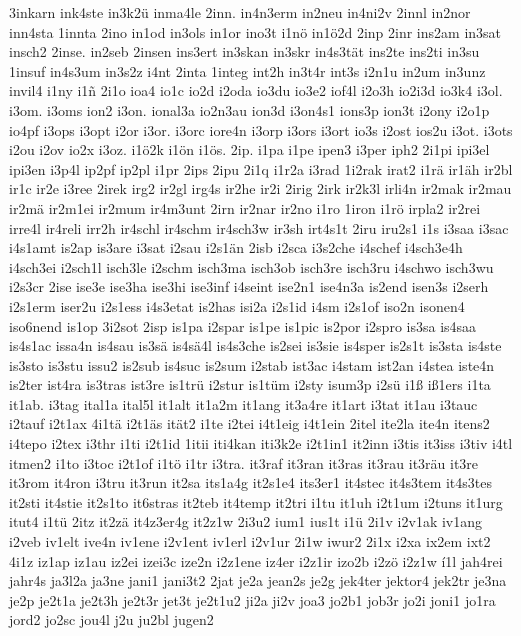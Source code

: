 {3inkarn
ink4ste
in3k2ü
inma4le
2inn.
in4n3erm
in2neu
in4ni2v
2innl
in2nor
inn4sta
1innta
2ino
in1od
in3ols
in1or
ino3t
i1nö
in1ö2d
2inp
2inr
ins2am
in3sat
insch2
2inse.
in2seb
2insen
ins3ert
in3skan
in3skr
in4s3tät
ins2te
ins2ti
in3su
1insuf
in4s3um
in3s2z
i4nt
2inta
1integ
int2h
in3t4r
int3s
i2n1u
in2um
in3unz
invil4
i1ny
i1ñ
2i1o
ioa4
io1c
io2d
i2oda
io3du
io3e2
iof4l
i2o3h
io2i3d
io3k4
i3ol.
i3om.
i3oms
ion2
i3on.
ional3a
io2n3au
ion3d
i3on4s1
ions3p
ion3t
i2ony
i2o1p
io4pf
i3ops
i3opt
i2or
i3or.
i3orc
iore4n
i3orp
i3ors
i3ort
io3s
i2ost
ios2u
i3ot.
i3ots
i2ou
i2ov
io2x
i3oz.
i1ö2k
i1ön
i1ös.
2ip.
i1pa
i1pe
ipen3
i3per
iph2
2i1pi
ipi3el
ipi3en
i3p4l
ip2pf
ip2pl
i1pr
2ips
2ipu
2i1q
i1r2a
i3rad
1i2rak
irat2
i1rä
ir1äh
ir2bl
ir1c
ir2e
i3ree
2irek
irg2
ir2gl
irg4s
ir2he
ir2i
2irig
2irk
ir2k3l
irli4n
ir2mak
ir2mau
ir2mä
ir2m1ei
ir2mum
ir4m3unt
2irn
ir2nar
ir2no
i1ro
1iron
i1rö
irpla2
ir2rei
irre4l
ir4reli
irr2h
ir4schl
ir4schm
ir4sch3w
ir3sh
irt4s1t
2iru
iru2s1
i1s
i3saa
i3sac
i4s1amt
is2ap
is3are
i3sat
i2sau
i2s1än
2isb
i2sca
i3s2che
i4schef
i4sch3e4h
i4sch3ei
i2sch1l
isch3le
i2schm
isch3ma
isch3ob
isch3re
isch3ru
i4schwo
isch3wu
i2s3cr
2ise
ise3e
ise3ha
ise3hi
ise3inf
i4seint
ise2n1
ise4n3a
is2end
isen3s
i2serh
i2s1erm
iser2u
i2s1ess
i4s3etat
is2has
isi2a
i2s1id
i4sm
i2s1of
iso2n
isonen4
iso6nend
is1op
3i2sot
2isp
is1pa
i2spar
is1pe
is1pic
is2por
i2spro
is3sa
is4saa
is4s1ac
issa4n
is4sau
is3sä
is4sä4l
is4s3che
is2sei
is3sie
is4sper
is2s1t
is3sta
is4ste
is3sto
is3stu
issu2
is2sub
is4suc
is2sum
i2stab
ist3ac
i4stam
ist2an
i4stea
iste4n
is2ter
ist4ra
is3tras
ist3re
is1trü
i2stur
is1tüm
i2sty
isum3p
i2sü
i1ß
iß1ers
i1ta
it1ab.
i3tag
ital1a
ital5l
it1alt
it1a2m
it1ang
it3a4re
it1art
i3tat
it1au
i3tauc
i2tauf
i2t1ax
4i1tä
i2t1äs
ität2
i1te
i2tei
i4t1eig
i4t1ein
2itel
ite2la
ite4n
itens2
i4tepo
i2tex
i3thr
i1ti
i2t1id
1itii
iti4kan
iti3k2e
i2t1in1
it2inn
i3tis
it3iss
i3tiv
i4tl
itmen2
i1to
i3toc
i2t1of
i1tö
i1tr
i3tra.
it3raf
it3ran
it3ras
it3rau
it3räu
it3re
it3rom
it4ron
i3tru
it3run
it2sa
its1a4g
it2s1e4
its3er1
it4stec
it4s3tem
it4s3tes
it2sti
it4stie
it2s1to
it6stras
it2teb
it4temp
it2tri
i1tu
it1uh
i2t1um
i2tuns
it1urg
itut4
i1tü
2itz
it2zä
it4z3er4g
it2z1w
2i3u2
ium1
ius1t
i1ü
2i1v
i2v1ak
iv1ang
i2veb
iv1elt
ive4n
iv1ene
i2v1ent
iv1erl
i2v1ur
2i1w
iwur2
2i1x
i2xa
ix2em
ixt2
4i1z
iz1ap
iz1au
iz2ei
izei3c
ize2n
i2z1ene
iz4er
i2z1ir
izo2b
i2zö
i2z1w
í1l
jah4rei
jahr4s
ja3l2a
ja3ne
jani1
jani3t2
2jat
je2a
jean2s
je2g
jek4ter
jektor4
jek2tr
je3na
je2p
je2t1a
je2t3h
je2t3r
jet3t
je2t1u2
ji2a
ji2v
joa3
jo2b1
job3r
jo2i
joni1
jo1ra
jord2
jo2sc
jou4l
j2u
ju2bl
jugen2
}
